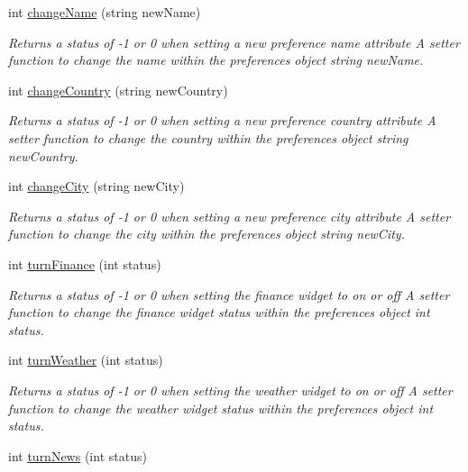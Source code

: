 \begin{DoxyCompactItemize}
int \mbox{\hyperlink{class_preferences_a350314fc1089f808411030293063225a}{change\+Name}} (string new\+Name)
\begin{DoxyCompactList}\small\item\em Returns a status of -\/1 or 0 when setting a new preference name attribute  A setter function to change the name within the preferences object  string new\+Name. \end{DoxyCompactList}\item 
int \mbox{\hyperlink{class_preferences_a2224b83d157c6f0010fcbb7b2e52ff5f}{change\+Country}} (string new\+Country)
\begin{DoxyCompactList}\small\item\em Returns a status of -\/1 or 0 when setting a new preference country attribute  A setter function to change the country within the preferences object  string new\+Country. \end{DoxyCompactList}\item 
int \mbox{\hyperlink{class_preferences_aa89a1bfc76845147a2c0db63ba73bbc7}{change\+City}} (string new\+City)
\begin{DoxyCompactList}\small\item\em Returns a status of -\/1 or 0 when setting a new preference city attribute  A setter function to change the city within the preferences object  string new\+City. \end{DoxyCompactList}\item 
int \mbox{\hyperlink{class_preferences_a061f9192e0abf787a7d18d40dd7712c9}{turn\+Finance}} (int status)
\begin{DoxyCompactList}\small\item\em Returns a status of -\/1 or 0 when setting the finance widget to on or off  A setter function to change the finance widget status within the preferences object  int status. \end{DoxyCompactList}\item 
int \mbox{\hyperlink{class_preferences_a59db5bdccd2dbae9aa3fa5e71580d69f}{turn\+Weather}} (int status)
\begin{DoxyCompactList}\small\item\em Returns a status of -\/1 or 0 when setting the weather widget to on or off  A setter function to change the weather widget status within the preferences object  int status. \end{DoxyCompactList}\item 
int \mbox{\hyperlink{class_preferences_afd7d3c7e5afa2d73087137d63ec0eccc}{turn\+News}} (int status)

\end{DoxyCompactItemize}
